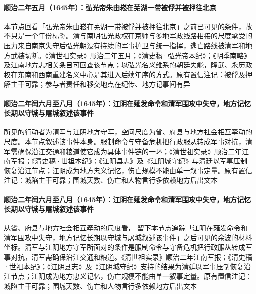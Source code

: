 \paragraph{顺治二年五月（1645年）：弘光帝朱由崧在芜湖一带被俘并被押往北京}
本节点回看「弘光帝朱由崧在芜湖一带被俘并被押往北京」之前已可见的条件，故 不只是一个年份标签。清与南明弘光政权在京师与多地军政线路相接的尺度承受的压力来自南京失守后弘光朝没有持续的军事护卫与统一指挥，逃亡路线被清军和地方武装切断。《清世祖实录》顺治二年五月；《清史稿·弘光帝本纪》；《明季南略》及江南地方志相关条目可回查该节点；以弘光名义维系的朝廷失能，隆武、永历政权在东南和西南重建名义中心是其进入后续年序的方式。原有置信注记：被俘及押解主干可靠；参与者责任和移交地点在纪传、地方记事间有异

\paragraph{顺治二年闰六月至八月（1645年）：江阴在薙发命令和清军围攻中失守，地方记忆长期以守城与屠城叙述该事件}
 所见的行动者为清军与江阴地方守军，空间尺度为省、府县与地方社会相互牵动的尺度。本节点叙述该事件本身。服制命令与守备危机把行政服从转成军事对抗，清军需确保沿江交通和粮道使它成为具体事件链的一环；《清世祖实录》顺治二年江南军报；《清史稿·世祖本纪》；《江阴县志》及《江阴城守纪》与清廷以军事压制恢复沿江节点；江阴成为地方忠义记忆，伤亡规模不能由单一叙事定量。原有置信注记：城陷主干可靠；围城天数、伤亡和人物言行多依赖地方后出文本

\paragraph{顺治二年闰六月至八月（1645年）：江阴在薙发命令和清军围攻中失守，地方记忆长期以守城与屠城叙述该事件}
从省、府县与地方社会相互牵动的尺度看， 留下本节点追踪「江阴在薙发命令和清军围攻中失守，地方记忆长期以守城与屠城叙述该事件」之后可见的余波的材料坐标。清军与江阴地方守军所面对的条件是服制命令与守备危机把行政服从转成军事对抗，清军需确保沿江交通和粮道。《清世祖实录》顺治二年江南军报；《清史稿·世祖本纪》；《江阴县志》及《江阴城守纪》支持的结果为清廷以军事压制恢复沿江节点；江阴成为地方忠义记忆，伤亡规模不能由单一叙事定量。原有置信注记：城陷主干可靠；围城天数、伤亡和人物言行多依赖地方后出文本

